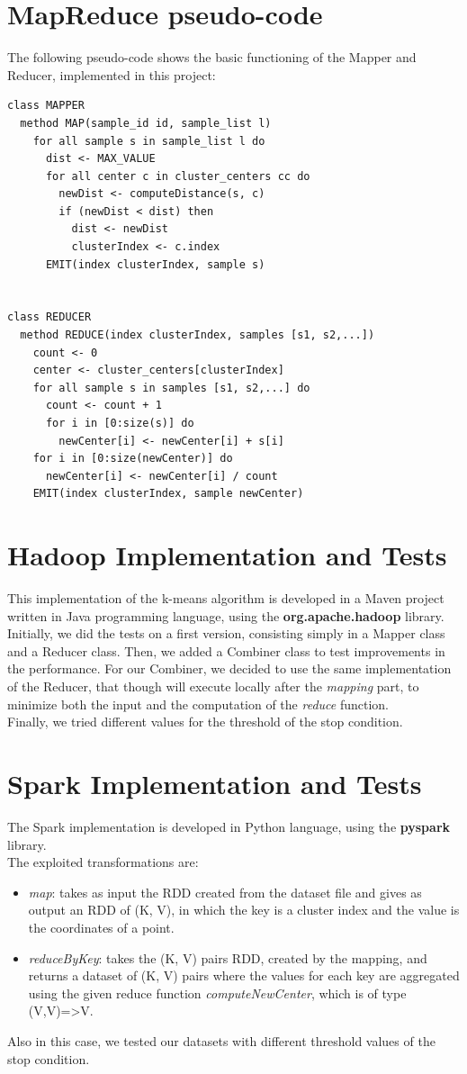 \documentclass[a4paper, oneside]{article}
\begin{document}
\section{MapReduce pseudo-code}
The following pseudo-code shows the basic functioning of the Mapper and Reducer, implemented in this project:
\begin{verbatim}
class MAPPER
  method MAP(sample_id id, sample_list l)
    for all sample s in sample_list l do
      dist <- MAX_VALUE
      for all center c in cluster_centers cc do
        newDist <- computeDistance(s, c)
        if (newDist < dist) then
          dist <- newDist
          clusterIndex <- c.index
      EMIT(index clusterIndex, sample s)


class REDUCER
  method REDUCE(index clusterIndex, samples [s1, s2,...])
    count <- 0
    center <- cluster_centers[clusterIndex]
    for all sample s in samples [s1, s2,...] do
      count <- count + 1
      for i in [0:size(s)] do
        newCenter[i] <- newCenter[i] + s[i]
    for i in [0:size(newCenter)] do
      newCenter[i] <- newCenter[i] / count
    EMIT(index clusterIndex, sample newCenter)
\end{verbatim}

\section{Hadoop Implementation and Tests}
This implementation of the k-means algorithm is developed in a Maven project written in Java programming language, using the \textbf{org.apache.hadoop} library.\\
Initially, we did the tests on a first version, consisting simply in a Mapper class and a Reducer class. Then, we added a Combiner class to test improvements in the performance. For our Combiner, we decided to use the same implementation of the Reducer, that though will execute locally after the \textit{mapping} part, to minimize both the input and the computation of the \textit{reduce} function.\\
Finally, we tried different values for the threshold of the stop condition.

\section{Spark Implementation and Tests}
The Spark implementation is developed in Python language, using the \textbf{pyspark} library.\\
The exploited transformations are:
\begin{itemize}
	\item \textit{map}: takes as input the RDD created from the dataset file and gives as output an RDD of (K, V), in which the key is a cluster index and the value is the coordinates of a point.
	\item \textit{reduceByKey}: takes the (K, V) pairs RDD, created by the mapping, and returns a dataset of (K, V) pairs where the values for each key are aggregated using the given reduce function \textit{computeNewCenter}, which is of type (V,V)=>V.
\end{itemize}
Also in this case, we tested our datasets with different threshold values of the stop condition.
\end{document}
